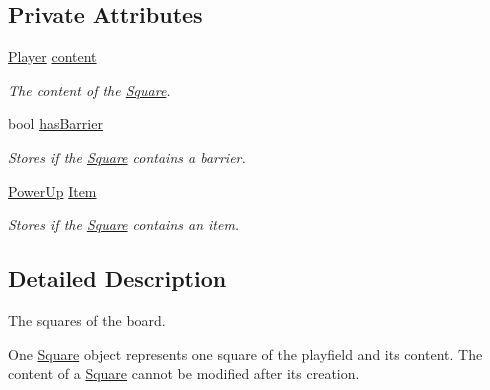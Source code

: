 \subsection*{Private Attributes}
\begin{DoxyCompactItemize}
\item 
\hypertarget{class_square_a927d50b9facba741730e47149e1d4d5c}{\hyperlink{common_8hpp_a64071507b27c62fbdfefd4e0d29e5f81}{Player} \hyperlink{class_square_a927d50b9facba741730e47149e1d4d5c}{content}}\label{class_square_a927d50b9facba741730e47149e1d4d5c}

\begin{DoxyCompactList}\small\item\em The content of the \hyperlink{class_square}{Square}. \end{DoxyCompactList}\item 
\hypertarget{class_square_ad45dd8efff3644a93ce040acee79a7ea}{bool \hyperlink{class_square_ad45dd8efff3644a93ce040acee79a7ea}{has\-Barrier}}\label{class_square_ad45dd8efff3644a93ce040acee79a7ea}

\begin{DoxyCompactList}\small\item\em Stores if the \hyperlink{class_square}{Square} contains a barrier. \end{DoxyCompactList}\item 
\hypertarget{class_square_a8190f775f36f202a4612d066c56ee9c2}{\hyperlink{common_8hpp_ad0becfb66125d1ea6decae2b28ebb6db}{Power\-Up} \hyperlink{class_square_a8190f775f36f202a4612d066c56ee9c2}{Item}}\label{class_square_a8190f775f36f202a4612d066c56ee9c2}

\begin{DoxyCompactList}\small\item\em Stores if the \hyperlink{class_square}{Square} contains an item. \end{DoxyCompactList}\end{DoxyCompactItemize}


\subsection{Detailed Description}
The squares of the board. 

One \hyperlink{class_square}{Square} object represents one square of the playfield and its content. The content of a \hyperlink{class_square}{Square} cannot be modified after its creation. 

